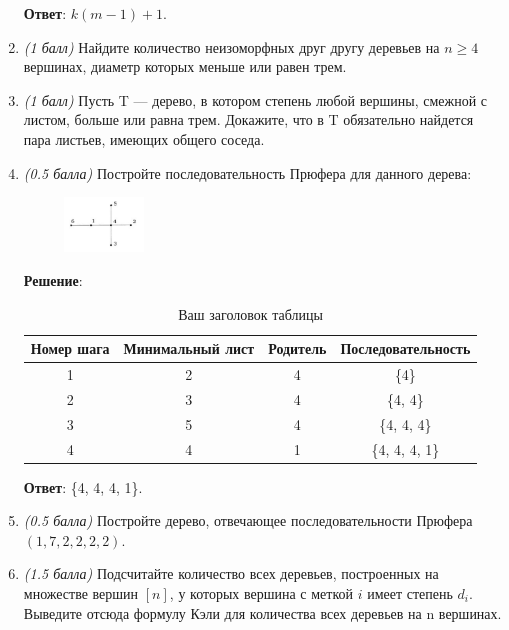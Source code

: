 \documentclass{article}
\begin{document}
\begin{enumerate}
    \textbf{Ответ}: $k(m-1)+1$.

    \item \textit{(1 балл)} Найдите количество неизоморфных друг другу деревьев на $n \geq 4$ вершинах, диаметр которых меньше или равен трем.
    \item \textit{(1 балл)} Пусть T — дерево, в котором степень любой вершины, смежной с листом, больше или равна трем. Докажите, что в T обязательно найдется пара листьев, имеющих общего соседа.
    \item \textit{(0.5 балла)} Постройте последовательность Прюфера для данного дерева:
    
    \begin{figure}[h]
        \centering
        \includegraphics[width=0.2\textwidth]{images/12.5.png}
    \end{figure}

    \textbf{Решение}:
    
    \begin{table}[h]
        \centering
        \begin{tabular}{|c|c|c|c|}
            \hline
            Номер шага & Минимальный лист & Родитель & Последовательность \\
            \hline
            1 & 2 & 4 & \{4\} \\
            \hline
            2 & 3 & 4 & \{4, 4\} \\
            \hline
            3 & 5 & 4 & \{4, 4, 4\} \\
            \hline
            4 & 4 & 1 & \{4, 4, 4, 1\} \\
            \hline
        \end{tabular}
        \caption{Ваш заголовок таблицы}
        \label{tab:your_label}
    \end{table}
    
    \textbf{Ответ}: \{4, 4, 4, 1\}.

    \item \textit{(0.5 балла)} Постройте дерево, отвечающее последовательности Прюфера $(1, 7, 2, 2, 2, 2)$.
    \item \textit{(1.5 балла)} Подсчитайте количество всех деревьев, построенных на множестве вершин $[n]$, у которых вершина с меткой $i$ имеет степень $d_i$. Выведите отсюда формулу Кэли для количества всех деревьев на n вершинах.
\end{enumerate}
\end{document}
